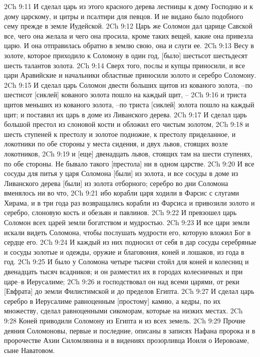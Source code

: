 2Ch 9:11  И сделал царь из этого красного дерева лестницы к дому Господню и к дому царскому, и цитры и псалтири для певцов. И не видано было подобного сему прежде в земле Иудейской.
2Ch 9:12  Царь же Соломон дал царице Савской все, чего она желала и чего она просила, кроме таких вещей, какие она привезла царю. И она отправилась обратно в землю свою, она и слуги ее.
2Ch 9:13  Весу в золоте, которое приходило к Соломону в один год, [было] шестьсот шестьдесят шесть талантов золота.
2Ch 9:14  Сверх того, послы и купцы приносили, и все цари Аравийские и начальники областные приносили золото и серебро Соломону.
2Ch 9:15  И сделал царь Соломон двести больших щитов из кованого золота, --по шестисот [сиклей] кованого золота пошло на каждый щит, --
2Ch 9:16  и триста щитов меньших из кованого золота, --по триста [сиклей] золота пошло на каждый щит; и поставил их царь в доме из Ливанского дерева.
2Ch 9:17  И сделал царь большой престол из слоновой кости и обложил его чистым золотом,
2Ch 9:18  и шесть ступеней к престолу и золотое подножие, к престолу приделанное, и локотники по обе стороны у места сидения, и двух львов, стоящих возле локотников,
2Ch 9:19  и [еще] двенадцать львов, стоящих там на шести ступенях, по обе стороны. Не бывало такого [престола] ни в одном царстве.
2Ch 9:20  И все сосуды для питья у царя Соломона [были] из золота, и все сосуды в доме из Ливанского дерева [были] из золота отборного; серебро во дни Соломона вменялось ни во что,
2Ch 9:21  ибо корабли царя ходили в Фарсис с слугами Хирама, и в три года раз возвращались корабли из Фарсиса и привозили золото и серебро, слоновую кость и обезьян и павлинов.
2Ch 9:22  И превзошел царь Соломон всех царей земли богатством и мудростью.
2Ch 9:23  И все цари земли искали видеть Соломона, чтобы послушать мудрости его, которую вложил Бог в сердце его.
2Ch 9:24  И каждый из них подносил от себя в дар сосуды серебряные и сосуды золотые и одежды, оружие и благовония, коней и лошаков, из года в год.
2Ch 9:25  И было у Соломона четыре тысячи стойл для коней и колесниц и двенадцать тысяч всадников; и он разместил их в городах колесничных и при царе--в Иерусалиме;
2Ch 9:26  и господствовал он над всеми царями, от реки [Евфрата] до земли Филистимской и до пределов Египта.
2Ch 9:27  И сделал царь серебро в Иерусалиме равноценным [простому] камню, а кедры, по их множеству, сделал равноценными сикоморам, которые на низких местах.
2Ch 9:28  Коней приводили Соломону из Египта и из всех земель.
2Ch 9:29  Прочие деяния Соломоновы, первые и последние, описаны в записях Нафана пророка и в пророчестве Ахии Силомлянина и в видениях прозорливца Иоиля о Иеровоаме, сыне Наватовом.
